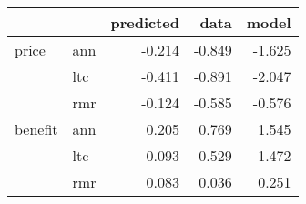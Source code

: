 \begin{tabular}{llrrr}
\toprule
        &     &  predicted &   data &  model \\
\midrule
price & ann &     -0.214 & -0.849 & -1.625 \\
        & ltc &     -0.411 & -0.891 & -2.047 \\
        & rmr &     -0.124 & -0.585 & -0.576 \\
benefit & ann &      0.205 &  0.769 &  1.545 \\
        & ltc &      0.093 &  0.529 &  1.472 \\
        & rmr &      0.083 &  0.036 &  0.251 \\
\bottomrule
\end{tabular}
